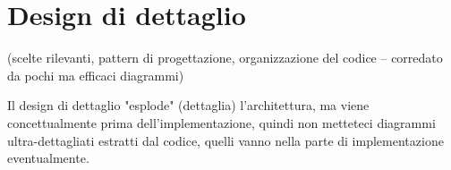 \section{Design di dettaglio}

(scelte rilevanti, pattern di progettazione, organizzazione del codice -- corredato da pochi ma efficaci diagrammi)

Il design di dettaglio "esplode" (dettaglia) l'architettura, ma viene concettualmente prima dell'implementazione, quindi non metteteci diagrammi ultra-dettagliati estratti dal codice, quelli vanno nella parte di implementazione eventualmente.
